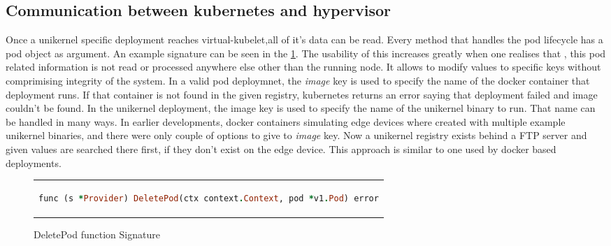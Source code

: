 \subsection{Communication between kubernetes and hypervisor}
Once a unikernel specific deployment reaches virtual-kubelet,all of it's data can be read. Every method that handles the pod lifecycle has a pod object as argument. An example signature can be seen in the \ref{fig:signature}. The usability of this increases greatly when one realises that , this pod related information is not read or processed anywhere else other than the running node. It allows to modify values to specific keys without comprimising integrity of the system. In a valid pod deploymnet, the \textit{image} key is used to specify the name of the docker container that deployment runs. If that container is not found in the given registry, kubernetes returns an error saying that deployment failed and image couldn't be found. In the unikernel deployment, the image key is used to specify the name of the unikernel binary to run. That name can be handled in many ways. In earlier developments, docker containers simulating edge devices where created with multiple example unikernel binaries, and there were only couple of options to give to \textit{image} key. Now a unikernel registry exists behind a FTP server and given values are searched there first, if they don't exist on the edge device. This approach is similar to one used by docker based deployments.

\begin{figure}[htpb]
  \centering
  \begin{tabular}{c}
  \begin{lstlisting}[language=ruby]
    func (s *Provider) DeletePod(ctx context.Context, pod *v1.Pod) error
\end{lstlisting}
\end{tabular}
\caption{DeletePod function Signature}\label{fig:signature}
\end{figure}

